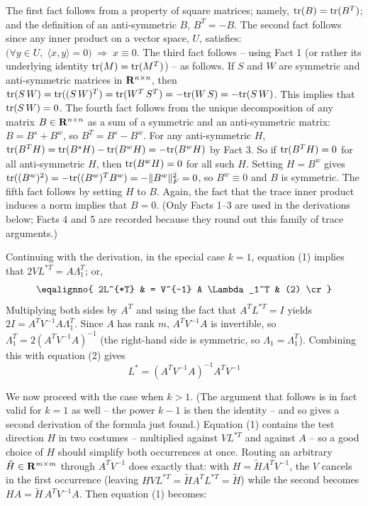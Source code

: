 The first fact follows from a property of square matrices; namely,
${\rm tr}(B) = {\rm tr}(B^T)$; and the definition of an anti-symmetric $B$, $B^T = -B$.
The second fact follows since any inner product on a vector space, $U$, satisfies:
$\bigl(\forall y \in U, \; \langle x, y \rangle = 0\bigr) \; \Rightarrow \; x \equiv 0$.
The third fact follows -- using Fact 1 (or rather its underlying identity ${\rm tr}(M) = {\rm tr}(M^T)$) -- as follows.
If $S$ and $W$ are symmetric and anti-symmetric matrices in ${\bf R}^{n \times n}$, then
${\rm tr}(S \, W) = {\rm tr}((S \, W)^T) = {\rm tr}(W^T \, S^T) = -{\rm tr}(W \, S) = - {\rm tr}(S\, W)$.
This implies that ${\rm tr}(S \, W) = 0$.
The fourth fact follows from the unique decomposition of any matrix
$B \in {\bf R}^{n \times n}$ as a sum of a symmetric and an anti-symmetric matrix:
$B = B^{s} + B^{w}$, so $B^T = B^{s} - B^{w}$. For any anti-symmetric $H$,
${\rm tr}(B^T H) = {\rm tr}(B^s H) - {\rm tr}(B^w H) = -{\rm tr}(B^w H)$ by Fact 3.
So if ${\rm tr}(B^T H) = 0$ for all anti-symmetric $H$, then ${\rm tr}(B^w H) = 0$ for all
such $H$. Setting $H = B^w$ gives ${\rm tr}((B^w)^2) = -{\rm tr}((B^w)^T B^w) = -\|B^w\|_F^2 = 0$,
so $B^{w} \equiv 0$ and $B$ is symmetric.
The fifth fact follows by setting $H$ to $B$. Again, the fact that the trace inner product induces a norm implies
that $B = 0$.
(Only Facts 1--3 are used in the derivations below; Facts 4 and 5 are
recorded because they round out this family of trace arguments.)


Continuing with the derivation, in the special case $k = 1$, equation (1) 
implies that 
$ 2VL^{*T}  = A\Lambda_1^T$; or, 
$$
\eqalignno{
2L^{*T} & = V^{-1} A \Lambda_1^T & (2) \cr }
$$
Multiplying both sides by $A^T$ and using the fact that
$A^TL^{*T} = I$ yields $2I = A^TV^{-1}A\Lambda_1^T$. Since $A$ has rank
$m$, $A^TV^{-1}A$ is invertible, so $\Lambda_1^T = 2(A^TV^{-1}A)^{-1}$
(the right-hand side is symmetric, so $\Lambda_1 = \Lambda_1^T$). Combining
this with equation (2) gives
$$
L^* = (A^TV^{-1}A)^{-1}A^TV^{-1}
$$

We now proceed with the case when $k > 1$. (The argument that follows is in
fact valid for $k = 1$ as well -- the power $k-1$ is then the identity --
and so gives a second derivation of the formula just found.) Equation (1) contains the test
direction $H$ in two costumes -- multiplied against $VL^{*T}$ and
against $A$ -- so a good choice of $H$ should simplify both occurrences
at once. Routing an arbitrary ${\tilde H} \in {\bf R}^{m \times m}$
through $A^TV^{-1}$ does exactly that: with $H = {\tilde H}A^TV^{-1}$,
the $V$ cancels in the first occurrence (leaving
$HVL^{*T} = {\tilde H}A^TL^{*T} = {\tilde H}$) while the second becomes
$HA = {\tilde H}\,A^TV^{-1}A$. Then equation (1) becomes:

